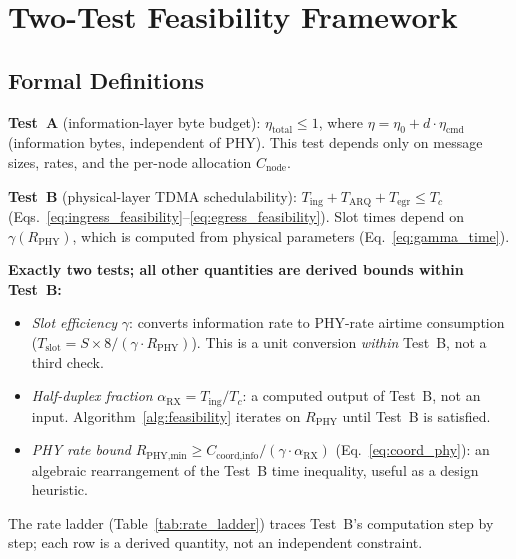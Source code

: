 \documentclass[journal]{IEEEtran}
\begin{document}
\section{Two-Test Feasibility Framework}
\label{sec:feasibility_framework}

\subsection{Formal Definitions}

\textbf{Test~A} (information-layer byte budget): $\eta_{\text{total}} \leq 1$, where $\eta = \eta_0 + d \cdot \eta_{\text{cmd}}$ (information bytes, independent of PHY). This test depends only on message sizes, rates, and the per-node allocation $C_{\text{node}}$.

\textbf{Test~B} (physical-layer TDMA schedulability): $T_{\text{ing}} + T_{\text{ARQ}} + T_{\text{egr}} \leq T_c$ (Eqs.~\ref{eq:ingress_feasibility}--\ref{eq:egress_feasibility}). Slot times depend on $\gamma(R_{\text{PHY}})$, which is computed from physical parameters (Eq.~\ref{eq:gamma_time}).

\textbf{Exactly two tests; all other quantities are derived bounds within Test~B:}
\begin{itemize}
    \item \emph{Slot efficiency} $\gamma$: converts information rate to PHY-rate airtime consumption ($T_{\text{slot}} = S \times 8 / (\gamma \cdot R_{\text{PHY}})$). This is a unit conversion \emph{within} Test~B, not a third check.
    \item \emph{Half-duplex fraction} $\alpha_{\text{RX}} = T_{\text{ing}} / T_c$: a computed output of Test~B, not an input. Algorithm~\ref{alg:feasibility} iterates on $R_{\text{PHY}}$ until Test~B is satisfied.
    \item \emph{PHY rate bound} $R_{\text{PHY,min}} \geq C_{\text{coord,info}} / (\gamma \cdot \alpha_{\text{RX}})$ (Eq.~\ref{eq:coord_phy}): an algebraic rearrangement of the Test~B time inequality, useful as a design heuristic.
\end{itemize}
The rate ladder (Table~\ref{tab:rate_ladder}) traces Test~B's computation step by step; each row is a derived quantity, not an independent constraint.
\end{document}
